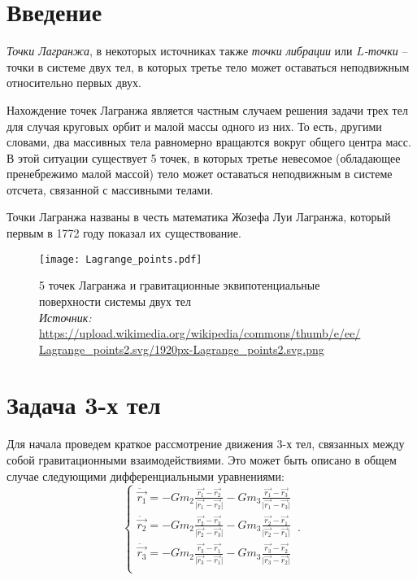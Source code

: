 \documentclass[12pt]{article}
\begin{document}
    \section{Введение}
    \par \textit{Точки Лагранжа}, в некоторых источниках также \textit{точки
    либрации} или \textit{$L$-точки} -- точки в системе двух тел, в которых
    третье тело может оставаться неподвижным относительно первых двух.
    \par Нахождение точек Лагранжа является частным случаем решения задачи
    трех тел для случая круговых орбит и малой массы одного из них. То есть,
    другими словами, два массивных тела равномерно вращаются вокруг общего
    центра масс. В этой ситуации существует 5 точек, в которых третье
    невесомое (обладающее пренебрежимо малой массой) тело может оставаться
    неподвижным в системе отсчета, связанной с массивными телами.
    \par Точки Лагранжа названы в честь математика Жозефа Луи Лагранжа,
    который первым в 1772 году показал их существование.
    \begin{figure}[H]
        \centering
        \texttt{[image: Lagrange\_points.pdf]}
        \caption{5 точек Лагранжа и гравитационные эквипотенциальные
        поверхности системы двух тел\\
        \textit{Источник:}
        \url{https://upload.wikimedia.org/wikipedia/commons/thumb/e/ee/
        Lagrange_points2.svg/1920px-Lagrange_points2.svg.png}}
    \end{figure}

    \section{Задача 3-х тел}
    Для начала проведем краткое рассмотрение движения 3-х тел, связанных между
    собой гравитационными взаимодействиями. Это может быть описано в общем
    случае следующими дифференциальными уравнениями:
    \begin{equation}
        \begin{cases}
            \ddot{\vec{r_1}} = -Gm_2\frac{\vec{r_1} - \vec{r_2}}
            {\lvert \vec{r_1} - \vec{r_2} \rvert} -
            Gm_3\frac{\vec{r_1} - \vec{r_3}}{\lvert \vec{r_1} - 
            \vec{r_3} \rvert}\\
            \ddot{\vec{r_2}} = -Gm_2\frac{\vec{r_2} - \vec{r_3}}
            {\lvert \vec{r_2} - \vec{r_3} \rvert} -
            Gm_3\frac{\vec{r_2} - \vec{r_1}}{\lvert \vec{r_2} - 
            \vec{r_1} \rvert}\\
            \ddot{\vec{r_3}} = -Gm_2\frac{\vec{r_3} - \vec{r_1}}
            {\lvert \vec{r_3} - \vec{r_1} \rvert} -
            Gm_3\frac{\vec{r_3} - \vec{r_2}}{\lvert \vec{r_3} - 
            \vec{r_2} \rvert}\\
        \end{cases}\,.
    \end{equation}
\end{document}
